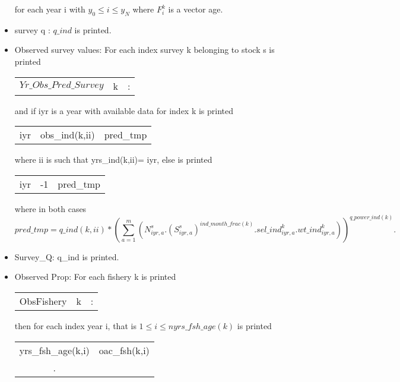 \documentclass{article}
\begin{document}
\begin{itemize}
\begin{center}
\begin{tabular}{c c c }
        \end{tabular}
        for each year i with $y_0\leq i \leq y_N$ where $F^k_i$ is a vector age.
    \end{center}
    \item survey q : $q\_ind$ is printed.
    \item Observed survey values: For each index survey k belonging to stock s is printed
    \begin{center}
        \begin{tabular}{c c c}
        $Yr\_Obs\_Pred\_Survey $     & k & :  \\
        \end{tabular}
    \end{center}

    and if iyr is a year with available data for index k is printed
    \begin{center}
        \begin{tabular}{c c c}
            iyr & obs\_ind(k,ii) & pred\_tmp \\
        \end{tabular}
    \end{center}
    where ii is such that yrs\_ind(k,ii)= iyr, else is printed
    \begin{center}
        \begin{tabular}{c c c }
           iyr  & -1  & pred\_tmp\\
        \end{tabular}
    \end{center}
    where in both cases 
    \begin{equation*}
        pred\_tmp= q\_ind(k,ii) * \left(\sum_{a=1}^m\left(N^s_{iyr,a}.{(S^{s}_{iyr,a})}^{ind\_month\_frac(k)}. sel\_ind^k_{iyr,a}.  wt\_ind^k_{iyr,a}\right)\right)^{q\_power\_ind(k)}.
    \end{equation*}
    \item Survey\_Q: q\_ind is printed.
    \item Observed Prop: For each fishery k is printed
    \begin{center}
        \begin{tabular}{c c c}
         ObsFishery    &  k & :\\
        \end{tabular}
    \end{center}
    then for each index year i, that is $1\leq i \leq nyrs\_fsh\_age(k)$ is printed
    \begin{center}
        \begin{tabular}{c c}
            yrs\_fsh\_age(k,i) &  oac\_fsh(k,i) \\.
            

\end{tabular}
\end{center}
\end{itemize}
\end{document}

